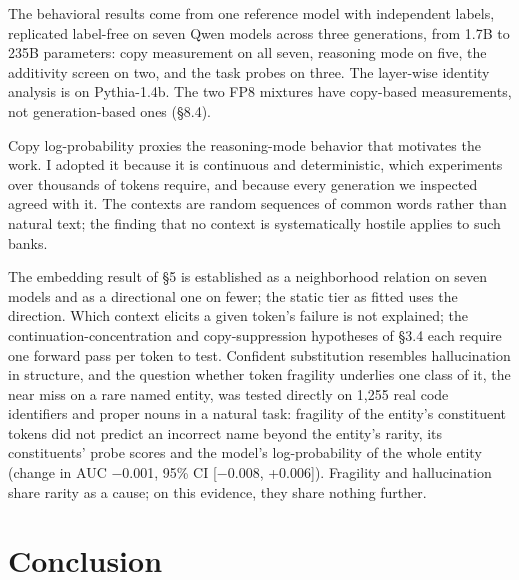 \documentclass[11pt]{article}
\begin{document}
The behavioral results come from one reference model with independent labels, replicated label-free on seven Qwen models across three generations, from 1.7B to 235B parameters: copy measurement on all seven, reasoning mode on five, the additivity screen on two, and the task probes on three. The layer-wise identity analysis is on Pythia-1.4b. The two FP8 mixtures have copy-based measurements, not generation-based ones (§8.4).

Copy log-probability proxies the reasoning-mode behavior that motivates the work. I adopted it because it is continuous and deterministic, which experiments over thousands of tokens require, and because every generation we inspected agreed with it. The contexts are random sequences of common words rather than natural text; the finding that no context is systematically hostile applies to such banks.

The embedding result of §5 is established as a neighborhood relation on seven models and as a directional one on fewer; the static tier as fitted uses the direction. Which context elicits a given token's failure is not explained; the continuation-concentration and copy-suppression hypotheses of §3.4 each require one forward pass per token to test. Confident substitution resembles hallucination in structure, and the question whether token fragility underlies one class of it, the near miss on a rare named entity, was tested directly on 1,255 real code identifiers and proper nouns in a natural task: fragility of the entity's constituent tokens did not predict an incorrect name beyond the entity's rarity, its constituents' probe scores and the model's log-probability of the whole entity (change in AUC \ensuremath{-}0.001, 95\% CI {[}\ensuremath{-}0.008, +0.006{]}). Fragility and hallucination share rarity as a cause; on this evidence, they share nothing further.

\section{Conclusion}\label{conclusion}
\end{document}
